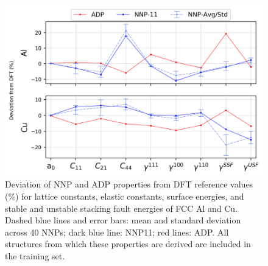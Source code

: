 \documentclass{article}
\begin{document}
\begin{figure}[H]%
\centering%
\includegraphics[width=1\textwidth,center]{./figures/matparam_purestats.png}%
\caption{Deviation of NNP and ADP properties from DFT reference values (\%) for lattice constants, elastic constants, surface energies, and stable and unstable stacking fault energies of FCC Al and Cu.  Dashed blue lines and error bars: mean and standard deviation across 40 NNPs; dark blue line: NNP11; red lines: ADP.  
All structures from which these properties are derived are included in the training set. }%
\label{fig:matparam_purestats}
\end{figure}
\end{document}
